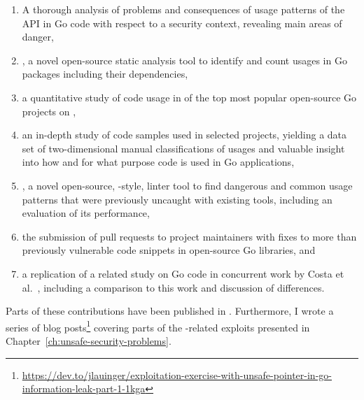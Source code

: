 \begin{enumerate}
    \item A thorough analysis of problems and consequences of usage patterns of the \unsafe{} \acrshort{API} in Go code
    with respect to a security context, revealing  main areas of danger,

    \item \toolGeiger, a novel open-source static analysis tool to identify and count \unsafe{} usages in Go packages
    including their dependencies,

    \item a quantitative study of \unsafe{} code usage in \projsAnalyzed{} of the top \projsTotal{} most popular
    open-source Go projects on \github{},

    \item an in-depth study of \numberLabeledCodeSnippets{} code samples used in \projsForLabeledCodeSnippets{} selected
    projects, yielding a data set of two-dimensional manual classifications of usages and valuable insight into how and
    for what purpose \unsafe{} code is used in Go applications,

    \item \toolSafer{}, a novel open-source, \toolVet{}-style, linter tool to find  dangerous and common
    \unsafe{} usage patterns that were previously uncaught with existing tools, including an evaluation of its
    performance,

    \item the submission of \numberPRs{} pull requests to project maintainers with fixes to more than
    \numberBugsFixedRounded{} previously vulnerable code snippets in open-source Go libraries, and

    \item a replication of a related study on \unsafe{} Go code in concurrent work by Costa et al.~\cite{costa2020},
    including a comparison to this work and discussion of differences.
\end{enumerate}

Parts of these contributions have been published in \cite{??}.
Furthermore, I wrote a series of blog
posts\footnote{\url{https://dev.to/jlauinger/exploitation-exercise-with-unsafe-pointer-in-go-information-leak-part-1-1kga}}
covering parts of the \unsafe{}-related exploits presented in
Chapter~\ref{ch:unsafe-security-problems}.



